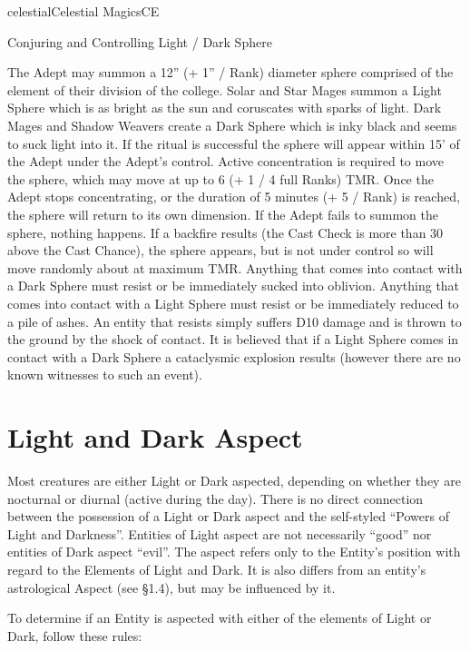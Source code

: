 \begin{College}[1.3]{celestial}{Celestial Magics}{CE}
\begin{ritual}[R-1]{Conjuring and Controlling Light / Dark Sphere}
\begin{effects}
The Adept may summon a 12” (+ 1” / Rank) diameter sphere comprised of
the element of their division of the college. Solar and Star Mages
summon a Light Sphere which is as bright as the sun and coruscates
with sparks of light.  Dark Mages and Shadow Weavers create a Dark
Sphere which is inky black and seems to suck light into it.  If the
ritual is successful the sphere will appear within 15’ of the Adept
under the Adept’s control.  Active concentration is required to move
the sphere, which may move at up to 6 (+ 1 / 4 full Ranks) TMR. Once
the Adept stops concentrating, or the duration of 5 minutes (+ 5 /
Rank) is reached, the sphere will return to its own dimension.  If the
Adept fails to summon the sphere, nothing happens.  If a backfire
results (the Cast Check is more than 30 above the Cast Chance), the
sphere appears, but is not under control so will move randomly about
at maximum TMR.  Anything that comes into contact with a Dark Sphere
must resist or be immediately sucked into oblivion.  Anything that
comes into contact with a Light Sphere must resist or be immediately
reduced to a pile of ashes.  An entity that resists simply suffers D10
damage and is thrown to the ground by the shock of contact.  It is
believed that if a Light Sphere comes in contact with a Dark Sphere a
cataclysmic explosion results (however there are no known witnesses to
such an event).
\end{effects}
\end{ritual}


\section{Light and Dark Aspect}

Most creatures are either Light or Dark aspected, depending on whether
they are nocturnal or diurnal (active during the day). There is no
direct connection between the possession of a Light or Dark aspect and
the self-styled “Powers of Light and Darkness”.  Entities of Light
aspect are not necessarily “good” nor entities of Dark aspect “evil”.
The aspect refers only to the Entity’s position with regard to the
Elements of Light and Dark. It is also differs from an entity’s
astrological Aspect (see §1.4), but may be influenced by it.

To determine if an Entity is aspected with either of the elements of
Light or Dark, follow these rules:


\end{College}
